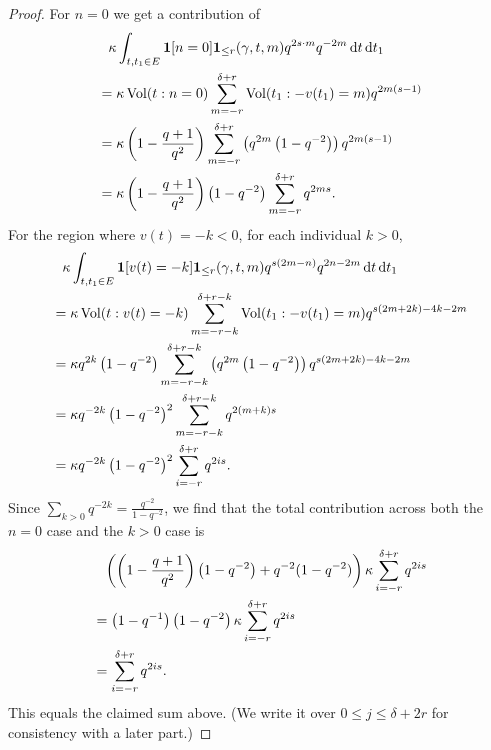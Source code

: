 \begin{proof}
  For $n = 0$ we get a contribution of
  \begin{align*}
    &\phantom= \kappa \int_{t, t_1 \in E} \mathbf{1}[n=0] \mathbf{1}_{\le r}(\gamma,t,m)
      q^{2s \cdot m} q^{-2m} \odif t \odif t_1 \\
    &= \kappa \Vol(t: n =0) \sum_{m=-r}^{\delta+r} \Vol(t_1: -v(t_1)=m) q^{2m(s-1)} \\
    &= \kappa \left( 1 - \frac{q+1}{q^2} \right) \sum_{m=-r}^{\delta+r}
    \left( q^{2m} \left( 1-q^{-2} \right) \right) q^{2m(s-1)} \\
    &= \kappa \left( 1 - \frac{q+1}{q^2} \right) \left( 1-q^{-2} \right)
    \sum_{m=-r}^{\delta+r} q^{2ms}.
  \end{align*}
  For the region where $v(t) = -k < 0$, for each individual $k > 0$,
  \begin{align*}
    &\phantom= \kappa \int_{t, t_1 \in E} \mathbf{1}[v(t)=-k] \mathbf{1}_{\le r}(\gamma,t,m)
      q^{s(2m-n)} q^{2n-2m} \odif t \odif t_1 \\
    &= \kappa \Vol(t: v(t)=-k) \sum_{m=-r-k}^{\delta+r-k}
      \Vol(t_1: -v(t_1)=m) q^{s(2m+2k)-4k-2m} \\
    &= \kappa q^{2k} \left( 1 - q^{-2} \right) \sum_{m=-r-k}^{\delta+r-k}
      \left( q^{2m} \left( 1-q^{-2} \right) \right) q^{s(2m+2k)-4k-2m} \\
    &= \kappa q^{-2k} \left( 1 - q^{-2} \right)^2
      \sum_{m=-r-k}^{\delta+r-k} q^{2(m+k)s} \\
    &= \kappa q^{-2k} \left( 1 - q^{-2} \right)^2 \sum_{i=-r}^{\delta+r} q^{2is}.
  \end{align*}
  Since $\sum_{k > 0} q^{-2k} = \frac{q^{-2}}{1-q^{-2}}$,
  we find that the total contribution across both
  the $n=0$ case and the $k > 0$ case is
  \begin{align*}
    &\phantom= \left( \left( 1 - \frac{q+1}{q^2} \right) \left( 1-q^{-2} \right)
      + q^{-2}(1-q^{-2})  \right) \kappa \sum_{i=-r}^{\delta+r} q^{2is} \\
    &= \left( 1-q\inv \right) \left(1-q^{-2} \right)
      \kappa \sum_{i=-r}^{\delta+r} q^{2is} \\
    &= \sum_{i=-r}^{\delta+r} q^{2is}.
  \end{align*}
  This equals the claimed sum above.
  (We write it over $0 \le j \le \delta+2r$ for consistency with a later part.)
\end{proof}

